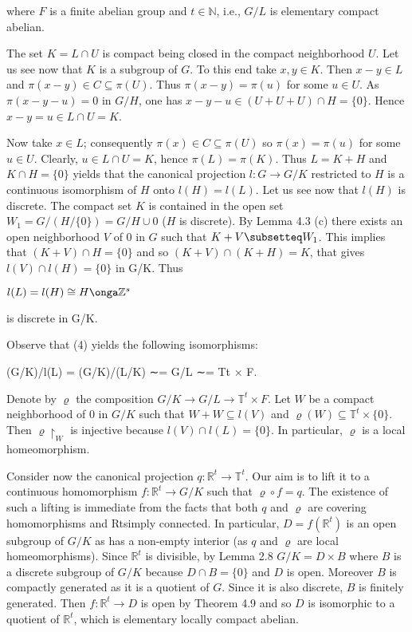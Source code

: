 \documentclass[12pt]{article}
\begin{document}
\begin{itemize}
\begin{itemize}
where $F$ is a finite abelian group and $t \in \mathbb{N}$, i.e., $G/L$ is elementary compact abelian.


    The set $K = L \cap U$ is compact being closed in the compact neighborhood $U$. Let us see now that $K$ is a
subgroup of $G$. To this end take $x, y \in K$. Then $x - y \in L$ and $\pi(x - y) \in C \subseteq \pi(U)$. Thus $\pi(x - y) = \pi(u)$ for
some $u \in U$. As $\pi(x-y-u) = 0$ in $G/H$, one has $x-y-u \in (U+U+U) \cap H = \{0\}$. Hence $x-y = u \in L\cap U = K$.


    Now take $x \in L$; consequently $\pi(x) \in C \subseteq \pi(U)$ so $\pi(x) = \pi(u)$ for some $u \in U$. Clearly, $u \in L \cap U = K$,
hence $\pi(L) = \pi(K)$. Thus $L = K + H$ and $K \cap H = \{0\}$ yields that the canonical projection $l : G \to G/K$
restricted to $H$ is a continuous isomorphism of $H$ onto $l(H) = l(L)$. Let us see now that $l(H)$ is discrete. The
compact set $K$ is contained in the open set $W_1 = G / (H / \{0\}) = G / H \cup {0}$ ($H$ is discrete). By Lemma 4.3
(c) there exists an open neighborhood $V$ of 0 in $G$ such that $K +V  \subsetteq W_1$. This implies that $(K + V) \cap H = \{0\}$
and so $(K + V) \cap (K + H) = K$, that gives $l(V ) \cap l(H) = \{0\}$ in G/K. Thus


    $l(L) = l(H) \cong H \onga \mathbb{Z}^s$


is discrete in G/K.


    Observe that (4) yields the following isomorphisms:


    (G/K)/l(L) = (G/K)/(L/K) ∼= G/L ∼= Tt × F.
    

Denote by $\varrho$ the composition $G/K → G/L \to \mathbb{T}^t \times F$. Let $W$ be a compact neighborhood of 0 in $G/K$ such
that $W + W \subseteq l(V )$ and $\varrho (W) \subseteq \mathbb{T}^t \times \{0\}$. Then $\varrho \upharpoonright_W$ is injective because $l(V ) \cap l(L) = \{0\}$. In particular, $\varrho$
is a local homeomorphism.


    Consider now the canonical projection $q : \mathbb{R}^t \to \mathbb{T}^t$. Our aim is to lift it to a continuous homomorphism
$f : \mathbb{R}^t \to G/K$ such that $\varrho \circ f = q$. The existence of such a lifting is immediate from the facts that both $q$
and $\varrho$ are covering homomorphisms and Rtsimply connected. In particular, $D = f(\mathbb{R}^t)$ is an open subgroup of
$G/K$ as has a non-empty interior (as $q$ and $\varrho$ are local homeomorphisms). Since $\mathbb{R}^t$ is divisible, by Lemma 2.8
$G/K = D \times B$ where $B$ is a discrete subgroup of $G/K$ because $D \cap B = \{0\}$ and $D$ is open. Moreover $B$ is
compactly generated as it is a quotient of $G$. Since it is also discrete, $B$ is finitely generated. Then $f : \mathbb{R}^t \to D$
is open by Theorem 4.9 and so $D$ is isomorphic to a quotient of $\mathbb{R}^t$, which is elementary locally compact abelian.



\end{itemize}
\end{itemize}
\end{document}
